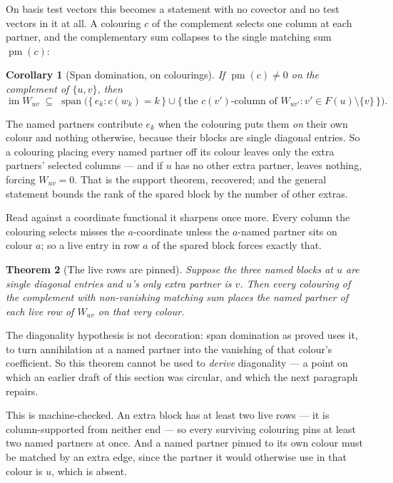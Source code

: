 \documentclass[11pt]{article}
\newtheorem{theorem}{Theorem}[section]
\newtheorem{corollary}[theorem]{Corollary}
\theoremstyle{definition}
\theoremstyle{remark}
\begin{document}
On basis test vectors this becomes a statement with no covector and no test vectors in
it at all. A colouring $c$ of the complement selects one column at each partner, and the
complementary sum collapses to the single matching sum $\operatorname{pm}(c)$:

\begin{corollary}[Span domination, on colourings]\label{cor:spancol}
If $\operatorname{pm}(c) \neq 0$ on the complement of $\{u,v\}$, then
\[
  \operatorname{im} W_{uv} \;\subseteq\;
  \operatorname{span}\bigl(\{\,e_k : c(w_k) = k\,\} \cup
    \{\,\text{the } c(v')\text{-column of } W_{uv'} : v' \in F(u)\setminus\{v\}\,\}\bigr).
\]
\end{corollary}

The named partners contribute $e_k$ when the colouring puts them \emph{on} their own
colour and nothing otherwise, because their blocks are single diagonal entries. So a
colouring placing every named partner off its colour leaves only the extra partners'
selected columns --- and if $u$ has no other extra partner, leaves nothing, forcing
$W_{uv} = 0$. That is the support theorem, recovered; and the general statement bounds
the rank of the spared block by the number of other extras.

Read against a coordinate functional it sharpens once more. Every column the colouring
selects misses the $a$-coordinate unless the $a$-named partner sits on colour $a$; so a
live entry in row $a$ of the spared block forces exactly that.

\begin{theorem}[The live rows are pinned]\label{thm:pinned}
Suppose the three named blocks at $u$ are single diagonal entries and $u$'s only extra
partner is $v$. Then every colouring of the complement with non-vanishing matching sum
places the named partner of each live row of $W_{uv}$ on that very colour.
\end{theorem}

The diagonality hypothesis is not decoration: span domination as proved uses it, to turn
annihilation at a named partner into the vanishing of that colour's coefficient. So this
theorem cannot be used to \emph{derive} diagonality --- a point on which an earlier draft of
this section was circular, and which the next paragraph repairs.

This is machine-checked. An extra block has at least two live rows --- it is
column-supported from neither end --- so every surviving colouring pins at least two named
partners at once. And a named partner pinned to its own colour must be matched by an extra
edge, since the partner it would otherwise use in that colour is $u$, which is absent.
\end{document}
